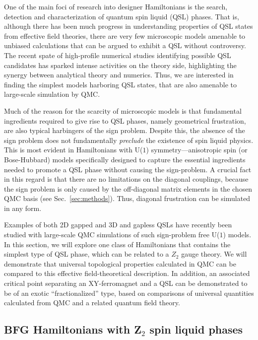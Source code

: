 \documentclass[range]{ar2e}
\begin{document}
One of the main foci of research into designer Hamiltonians is the search, detection and characterization of quantum spin liquid (QSL) phases.  That is, although there 
has been much progress in understanding properties of QSL states from effective field theories, there are very few microscopic models amenable to unbiased calculations 
that can be argued to exhibit a QSL without controversy. The recent spate of high-profile numerical studies identifying possible QSL candidates \cite{Yan,Meng10,J1J2} has 
sparked intense activities on the theory side, highlighting the synergy between analytical theory and numerics. Thus, we are interested in finding the simplest models 
harboring QSL states, that are also amenable to large-scale simulation by QMC.

Much of the reason for the scarcity of microscopic models is that fundamental ingredients required to give rise to QSL phases, namely geometrical frustration, are also typical 
harbingers of the sign problem.  Despite this, the absence of the sign problem does not fundamentally {\it preclude} the existence of spin liquid physics.  This is most evident 
in Hamiltonians with U($1$) symmetry---anisotropic spin (or Bose-Hubbard) models specifically designed to capture the essential ingredients needed to promote a QSL phase without 
causing the sign-problem. A crucial fact in this regard is that there are no limitations on the diagonal couplings, because the sign problem is only caused by the off-diagonal
matrix elements in the chosen QMC basis (see Sec.~\ref{sec:methods}). Thus, diagonal frustration can be simulated in any form.

Examples of both 2D gapped \cite{Isakov1,Isakov2,Long,TopoEE} and 3D and gapless \cite{Isakov3} QSLs have recently been studied with large-scale QMC simulations of 
such sign-problem free U($1$) models. In this section, we will explore one class of Hamiltonians that contains the simplest type of QSL phase, which can be related to a 
$Z_2$ gauge theory. We will demonstrate that universal topological properties calculated in QMC can be compared to this effective field-theoretical description.  
In addition, an associated critical point separating an XY-ferromagnet and a QSL can be demonstrated to be of an exotic ``fractionalized'' type, based on comparisons of 
universal quantities calculated from QMC and a related quantum field theory.

\subsection{BFG Hamiltonians with Z$_2$ spin liquid phases}
\end{document}
